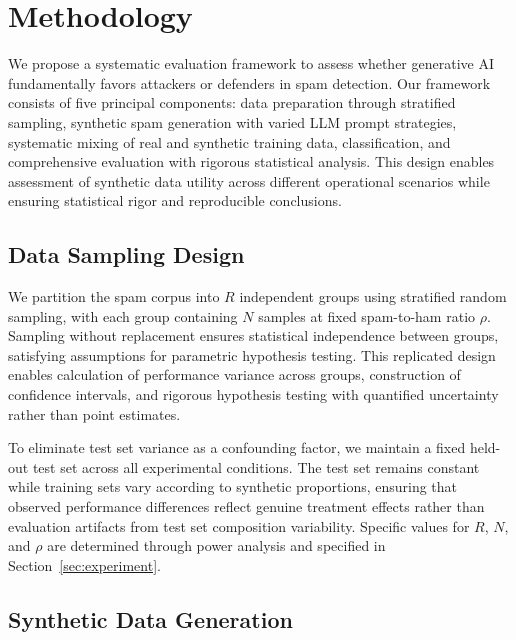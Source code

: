 \section{Methodology}
\label{sec:methodology}

We propose a systematic evaluation framework to assess whether generative AI fundamentally favors attackers or defenders in spam detection. Our framework consists of five principal components: data preparation through stratified sampling, synthetic spam generation with varied LLM prompt strategies, systematic mixing of real and synthetic training data, classification, and comprehensive evaluation with rigorous statistical analysis. This design enables assessment of synthetic data utility across different operational scenarios while ensuring statistical rigor and reproducible conclusions.

\subsection{Data Sampling Design}

We partition the spam corpus into $R$ independent groups using stratified random sampling, with each group containing $N$ samples at fixed spam-to-ham ratio $\rho$. Sampling without replacement ensures statistical independence between groups, satisfying assumptions for parametric hypothesis testing. This replicated design enables calculation of performance variance across groups, construction of confidence intervals, and rigorous hypothesis testing with quantified uncertainty rather than point estimates.

To eliminate test set variance as a confounding factor, we maintain a fixed held-out test set across all experimental conditions. The test set remains constant while training sets vary according to synthetic proportions, ensuring that observed performance differences reflect genuine treatment effects rather than evaluation artifacts from test set composition variability. Specific values for $R$, $N$, and $\rho$ are determined through power analysis and specified in Section~\ref{sec:experiment}.

\subsection{Synthetic Data Generation}

